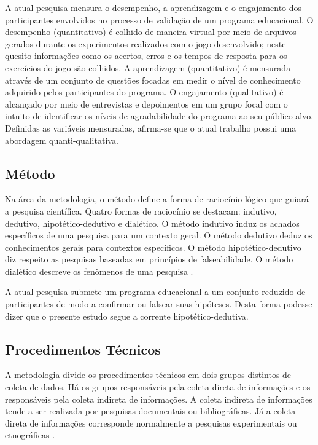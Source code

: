A atual pesquisa mensura o desempenho, a aprendizagem e o engajamento dos participantes envolvidos no processo de validação de um programa educacional. O desempenho (quantitativo) é colhido de maneira virtual por meio de arquivos gerados durante os experimentos realizados com o jogo desenvolvido; neste quesito informações como os acertos, erros e os tempos de resposta para os exercícios do jogo são colhidos. A aprendizagem (quantitativo) é mensurada através de um conjunto de questões focadas em medir o nível de conhecimento adquirido pelos participantes do programa. O engajamento (qualitativo) é alcançado por meio de entrevistas e depoimentos em um grupo focal com o intuito de identificar os níveis de agradabilidade do programa ao seu público-alvo. Definidas as variáveis mensuradas, afirma-se que o atual trabalho possui uma abordagem quanti-qualitativa. 

\subsection{Método}\label{sub:Metodo}

Na área da metodologia, o método define a forma de raciocínio lógico que guiará a pesquisa científica. Quatro formas de raciocínio se destacam: indutivo, dedutivo, hipotético-dedutivo e dialético. O método indutivo induz os achados específicos de uma pesquisa para um contexto geral. O método dedutivo deduz os conhecimentos gerais para contextos específicos. O método hipotético-dedutivo diz respeito as pesquisas baseadas em princípios de falseabilidade. O método dialético descreve os fenômenos de uma pesquisa \cite{marconi2003lakatos}.  

A atual pesquisa submete um programa educacional a um conjunto reduzido de participantes de modo a confirmar ou falsear suas hipóteses. Desta forma podesse dizer que o presente estudo segue a corrente hipotético-dedutiva.


\subsection{Procedimentos Técnicos}\label{sub:Procedimentos}

A metodologia divide os procedimentos técnicos em dois grupos distintos de coleta de dados. Há os grupos responsáveis pela coleta direta de informações e os responsáveis pela coleta indireta de informações. A coleta indireta de informações tende a ser realizada por pesquisas documentais ou bibliográficas. Já a coleta direta de informações corresponde normalmente a pesquisas experimentais ou etnográficas \cite{cordova2009pesquisa}. 

